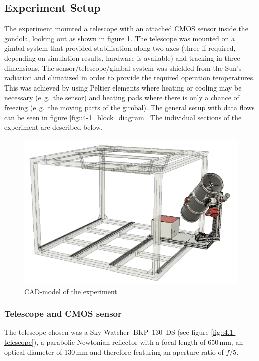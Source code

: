 \subsection{Experiment Setup} \label{Experiment_Setup}




The experiment mounted a telescope with an attached CMOS sensor inside the gondola, looking out as shown in figure \ref{fig::4-1_CAD}. The telescope was mounted on a gimbal system that provided stabilisation along two axes \st{(three if required, depending on simulation results, hardware is available)} and tracking in three dimensions. The sensor/telescope/gimbal system was shielded from the Sun's radiation and climatized in order to provide the required operation temperatures. This was achieved by using Peltier elements where heating or cooling may be necessary (e.\,g.~the sensor) and heating pads where there is only a chance of freezing (e.\,g.~the moving parts of the gimbal). The general setup with data flows can be seen in figure \ref{fig::4-1_block_diagram}. The individual sections of the experiment are described below.

\begin{figure}[h]
	\centering
	\includegraphics[width=0.7\linewidth]{4-experiment-design/img/mechanical/iso0.png}
	\caption{CAD-model of the experiment}
	\label{fig::4-1_CAD}
\end{figure}


\subsubsection{Telescope and CMOS sensor}
The telescope chosen was a Sky-Watcher~BKP~130~DS (see figure \ref{fig::4.1-telescope}), a parabolic Newtonian reflector with a focal length of 650\,mm, an optical diameter of 130\,mm and therefore featuring an aperture ratio of $f/5$. 

